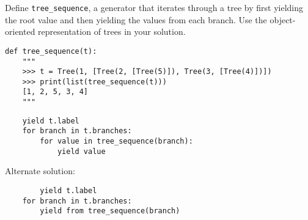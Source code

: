 \begin{blocksection}
\question Define \lstinline$tree_sequence$, a generator that iterates through a tree by first yielding the root value and then yielding the values from each branch.
 Use the object-oriented representation of trees in your solution.

\begin{lstlisting}
def tree_sequence(t):
    """
    >>> t = Tree(1, [Tree(2, [Tree(5)]), Tree(3, [Tree(4)])])
    >>> print(list(tree_sequence(t)))
    [1, 2, 5, 3, 4]
    """
\end{lstlisting}

\begin{solution}[1.5in]
\begin{lstlisting}
	yield t.label
	for branch in t.branches:
		for value in tree_sequence(branch):
			yield value
\end{lstlisting}
Alternate solution:
\begin{lstlisting}
        yield t.label
	for branch in t.branches:
		yield from tree_sequence(branch)
\end{lstlisting}
\end{solution}
\end{blocksection}
